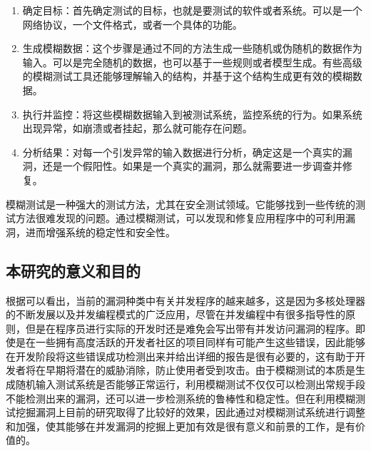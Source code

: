 \begin{enumerate}
\item 确定目标：首先确定测试的目标，也就是要测试的软件或者系统。可以是一个网络协议，一个文件格式，或者一个具体的功能。
\item 生成模糊数据：这个步骤是通过不同的方法生成一些随机或伪随机的数据作为输入。可以是完全随机的数据，也可以基于一些规则或者模型生成。有些高级的模糊测试工具还能够理解输入的结构，并基于这个结构生成更有效的模糊数据。
\item 执行并监控：将这些模糊数据输入到被测试系统，监控系统的行为。如果系统出现异常，如崩溃或者挂起，那么就可能存在问题。
\item 分析结果：对每一个引发异常的输入数据进行分析，确定这是一个真实的漏洞，还是一个假阳性。如果是一个真实的漏洞，那么就需要进一步调查并修复。
\end{enumerate}

模糊测试是一种强大的测试方法，尤其在安全测试领域。它能够找到一些传统的测试方法很难发现的问题。通过模糊测试，可以发现和修复应用程序中的可利用漏洞，进而增强系统的稳定性和安全性。

\subsection{本研究的意义和目的}

根据\cite{cvedetailsSecurityVulnerability}可以看出，当前的漏洞种类中有关并发程序的越来越多，这是因为多核处理器的不断发展以及并发编程模式的广泛应用，尽管在并发编程中有很多指导性的原则，但是在程序员进行实际的开发时还是难免会写出带有并发访问漏洞的程序。即使是在一些拥有高度活跃的开发者社区的项目同样有可能产生这些错误，因此能够在开发阶段将这些错误成功检测出来并给出详细的报告是很有必要的，这有助于开发者将在早期将潜在的威胁消除，防止使用者受到攻击。由于模糊测试的本质是生成随机输入测试系统是否能够正常运行，利用模糊测试不仅仅可以检测出常规手段不能检测出来的漏洞，还可以进一步检测系统的鲁棒性和稳定性。但在利用模糊测试挖掘漏洞上目前的研究取得了比较好的效果，因此通过对模糊测试系统进行调整和加强，使其能够在并发漏洞的挖掘上更加有效是很有意义和前景的工作，是有价值的。